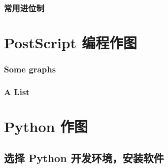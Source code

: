 \documentclass[zihao=-4,heading=true,a4paper,twoside,openany]{ctexbook}
\begin{document}
\section{常用进位制}\label{sec:I.2}



\part{PostScript 编程作图}
\section{Some graphs}


\section{A List}


\part{Python 作图}

\appendix
\chapter{选择 Python 开发环境，安装软件}


\printindex
\printbibliography
\end{document}

